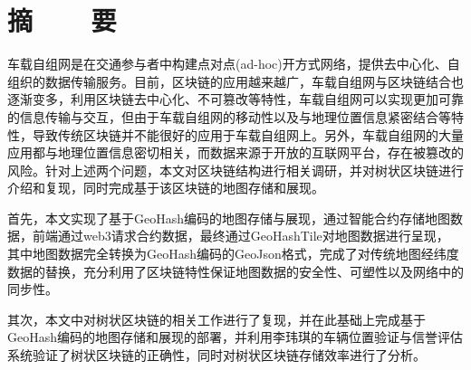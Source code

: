 %
%
%
%
%

\vspace*{-11mm}

\begin{center}
  \heiti{}\textbf{\thesisTitle}
\end{center}

\vspace*{2mm}

{\let\clearpage\relax \chapter*{\textmd{摘~~~~要}}}
\setcounter{page}{1}

\vspace*{1mm}

\setlength{\parskip}{0em}

车载自组网是在交通参与者中构建点对点(ad-hoc)开方式网络，提供去中心化、自组织的数据传输服务。目前，区块链的应用越来越广，车载自组网与区块链结合也逐渐变多，利用区块链去中心化、不可篡改等特性，车载自组网可以实现更加可靠的信息传输与交互，但由于车载自组网的移动性以及与地理位置信息紧密结合等特性，导致传统区块链并不能很好的应用于车载自组网上。另外，车载自组网的大量应用都与地理位置信息密切相关，而数据来源于开放的互联网平台，存在被篡改的风险。针对上述两个问题，本文对区块链结构进行相关调研，并对树状区块链进行介绍和复现，同时完成基于该区块链的地图存储和展现。

首先，本文实现了基于GeoHash编码的地图存储与展现，通过智能合约存储地图数据，前端通过web3请求合约数据，最终通过GeoHashTile对地图数据进行呈现，  其中地图数据完全转换为GeoHash编码的GeoJson格式，完成了对传统地图经纬度数据的替换，充分利用了区块链特性保证地图数据的安全性、可塑性以及网络中的同步性。

其次，本文中对树状区块链的相关工作进行了复现，并在此基础上完成基于GeoHash编码的地图存储和展现的部署，并利用李玮琪的车辆位置验证与信誉评估系统验证了树状区块链的正确性，同时对树状区块链存储效率进行了分析。

